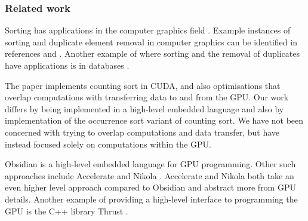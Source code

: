 \subsubsection{Related work} 

Sorting has applications in the computer graphics field \cite{SINTORNSORT}. 
Example instances of sorting and duplicate element removal in computer graphics 
can be identified in references \cite{Olsson} and \cite{Karras}. Another example 
of where sorting and the removal of duplicates have applications is 
in databases \cite{REMOVEDUPS}. 


The paper \cite{CSORT} implements counting sort in CUDA, and also optimisations 
that overlap computations with transferring data to and from the GPU.
Our work differs by being implemented in a high-level embedded
language and also by implementation of the occurrence sort variant of counting sort. We have not been concerned with
trying to overlap computations and data transfer, but have instead
focused solely on computations within the GPU.

Obsidian is a high-level embedded language for GPU
programming. Other such approaches include Accelerate
\cite{ACCELERATEDAMP11} and Nikola \cite{NIKOLA}. Accelerate and Nikola both take an even
higher level approach compared to Obsidian and abstract more from GPU
details. Another example of providing a high-level interface to
programming the GPU is the C++ library Thrust \cite{THRUST}.



